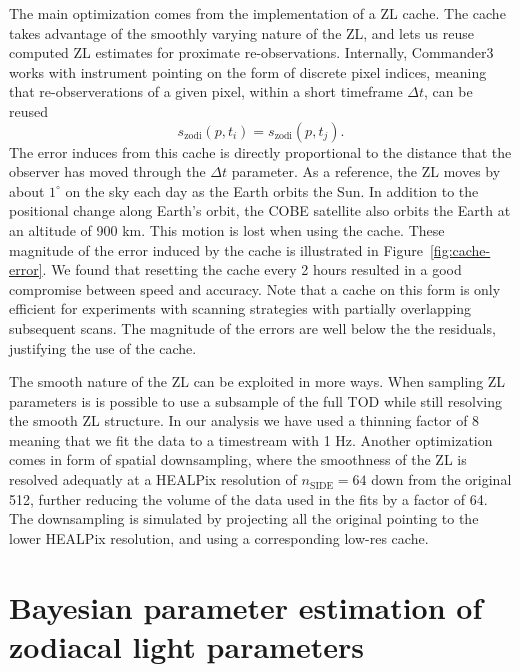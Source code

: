 \documentclass{aa}
\begin{document}
The main optimization comes from the implementation of a ZL cache. The 
cache takes advantage of the smoothly varying nature of the ZL, and lets 
us reuse computed ZL estimates for proximate re-observations. 
Internally, Commander3 works with instrument pointing on the form of 
discrete pixel indices, meaning that re-observerations of a given pixel, 
within a short timeframe $\Delta t$, can be reused
\begin{equation}
    s_\mathrm{zodi}(p, t_i) = s_\mathrm{zodi}(p, t_j).
\end{equation}
The error induces from this cache is directly proportional to the 
distance that the observer has moved through the $\Delta t$ parameter. 
As a reference, the ZL moves by about $1^\circ$ on the sky each day as 
the Earth orbits the Sun. In addition to the positional change along 
Earth's orbit, the COBE satellite also orbits the Earth at an altitude 
of 900 km. This motion is lost when using the cache. These magnitude of 
the error induced by the cache is illustrated in 
Figure~\ref{fig:cache-error}.  We found that resetting the cache every 
2 hours resulted in a good compromise between speed and accuracy. Note 
that a cache on this form is only efficient for experiments with scanning 
strategies with partially overlapping subsequent scans. The magnitude of
the errors are well below the the residuals, justifying the use of the 
cache.

The smooth nature of the ZL can be exploited in more ways. When sampling 
ZL parameters is is possible to use a subsample of the full TOD while 
still resolving the smooth ZL structure. In our analysis we have used a 
thinning factor of 8 meaning that we fit the data to a timestream with 1 
Hz. Another optimization comes in form of spatial downsampling, where 
the smoothness of the ZL is resolved adequatly at a HEALPix resolution 
of $n_\mathrm{SIDE} = 64$ down from the original 512, further reducing 
the volume of the data used in the fits by a factor of 64. The 
downsampling is simulated by projecting all the original pointing to the 
lower HEALPix resolution, and using a corresponding low-res cache.


\section{Bayesian parameter estimation of zodiacal light parameters}\label{sect:param-estimation}
\end{document}
